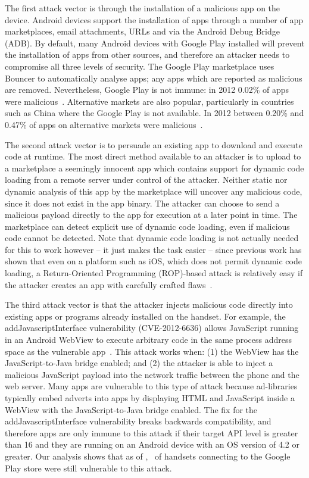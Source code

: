 \documentclass{llncs}
\let\OldTodo\todo
\renewcommand{\todo}{\OldTodo}%
\begin{document}
The first attack vector is through the installation of a malicious app on the device.
Android devices support the installation of apps through a number of app marketplaces, email attachments, URLs and via the Android Debug Bridge (ADB).
By default, many Android devices with Google Play installed will prevent the installation of apps from other sources, and therefore an attacker needs to compromise all three levels of security.
The Google Play marketplace uses Bouncer to automatically analyse apps; any apps which are reported as malicious are removed.
Nevertheless, Google Play is not immune: in 2012 0.02\% of apps were malicious~\cite{Zhou2012a}.
Alternative markets are also popular, particularly in countries such as China where the Google Play is not available. 
In 2012 between 0.20\% and 0.47\% of apps on alternative markets were malicious~\cite{Zhou2012a}.

The second attack vector is to persuade an existing app to download and execute code at runtime.
The most direct method available to an attacker is to upload to a marketplace a seemingly innocent app which contains support for dynamic code loading from a remote server under control of the attacker.
Neither static nor dynamic analysis of this app by the marketplace will uncover any malicious code, since it does not exist in the app binary.
The attacker can choose to send a malicious payload directly to the app for execution at a later point in time.
The marketplace can detect explicit use of dynamic code loading, even if malicious code cannot be detected. Note that dynamic code loading is not actually needed for this to work however -- it just makes the task easier -- since previous work has shown that even on a platform such as iOS, which does not permit dynamic code loading, a Return-Oriented Programming (ROP)-based attack is relatively easy if the attacker creates an app with carefully crafted flaws~\cite{Wang2013a}.

The third attack vector is that the attacker injects malicious code directly into existing apps or programs already installed on the handset. 
For example, the addJavascriptInterface vulnerability (CVE-2012-6636) allows JavaScript running in an Android WebView to execute arbitrary code in the same process address space as the vulnerable app~\cite{Thomas2015}.
This attack works when: (1) the WebView has the JavaScript-to-Java bridge enabled; and (2) the attacker is able to inject a malicious JavaScript payload into the network traffic between the phone and the web server. 
Many apps are vulnerable to this type of attack because ad-libraries typically embed adverts into apps by displaying HTML and JavaScript inside a WebView with the JavaScript-to-Java bridge enabled. 
The fix for the addJavascriptInterface vulnerability breaks backwards compatibility, and therefore apps are only immune to this attack if their target API level is greater than 16 and they are running on an Android device with an OS version of 4.2 or greater.
Our analysis shows that as of \daGPAPISeventeenLaterDate, \daGPAPISeventeenEarlierProportion\ of handsets connecting to the Google Play store were still vulnerable to this attack.
\end{document}

